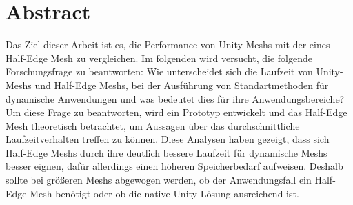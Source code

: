 \section{Abstract}
Das Ziel dieser Arbeit ist es, die Performance von Unity-Meshs mit der eines Half-Edge Mesh zu vergleichen. Im folgenden wird versucht, die folgende Forschungsfrage zu beantworten: Wie unterscheidet sich die Laufzeit von Unity-Meshs und Half-Edge Meshs, bei der Ausf\"uhrung von Standartmethoden f\"ur dynamische Anwendungen und was bedeutet dies f\"ur ihre Anwendungsbereiche?
Um diese Frage zu beantworten, wird ein Prototyp entwickelt und das Half-Edge Mesh theoretisch betrachtet, um Aussagen \"uber das durchschnittliche Laufzeitverhalten treffen zu k\"onnen.
Diese Analysen haben gezeigt, dass sich Half-Edge Meshs durch ihre deutlich bessere Laufzeit f\"ur dynamische Meshs besser eignen, daf\"ur allerdings einen h\"oheren Speicherbedarf aufweisen. Deshalb sollte bei gr\"o{\ss}eren Meshs abgewogen werden, ob der Anwendungsfall ein Half-Edge Mesh ben\"otigt oder ob die native Unity-L\"osung ausreichend ist.